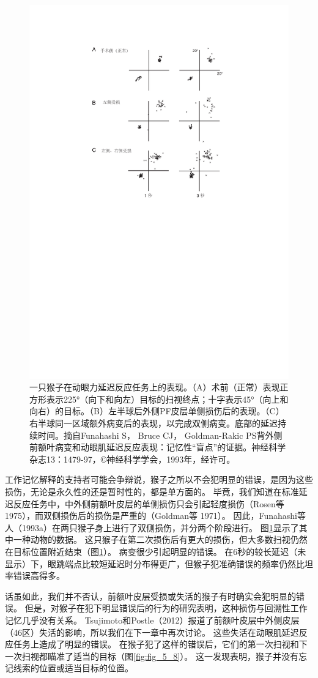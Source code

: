 \begin{figure}
	\centering
	\includegraphics[width=0.7\linewidth]{image_pfc/Fig_5_7}
	\caption{一只猴子在动眼力延迟反应任务上的表现。（A）术前（正常）表现正方形表示225°（向下和向左）目标的扫视终点；十字表示45°（向上和向右）的目标。（B）左半球后外侧PF皮层单侧损伤后的表现。（C）右半球同一区域额外病变后的表现，以完成双侧病变。底部的延迟持续时间。摘自Funahashi S， Bruce CJ， Goldman-Rakic PS背外侧前额叶病变和动眼肌延迟反应表现：记忆性“盲点”的证据。神经科学杂志13：1479-97，©神经科学学会，1993年，经许可。}
	\label{fig:fig_5_7}
\end{figure}


工作记忆解释的支持者可能会争辩说，猴子之所以不会犯明显的错误，是因为这些损伤，无论是永久性的还是暂时性的，都是单方面的。
毕竟，我们知道在标准延迟反应任务中，中外侧前额叶皮层的单侧损伤只会引起轻度损伤（Rosen等 1975），而双侧损伤后的损伤是严重的（Goldman等 1971）。
因此，Funahashi等人（1993a）在两只猴子身上进行了双侧损伤，并分两个阶段进行。
图\ref{fig:fig_5_7}显示了其中一种动物的数据。
这只猴子在第二次损伤后有更大的损伤，但大多数扫视仍然在目标位置附近结束（图\ref{fig:fig_5_7}）。
病变很少引起明显的错误。
在6秒的较长延迟（未显示）下，眼跳端点比较短延迟时分布得更广，但猴子犯准确错误的频率仍然比坦率错误高得多。


话虽如此，我们并不否认，前额叶皮层受损或失活的猴子有时确实会犯明显的错误。
但是，对猴子在犯下明显错误后的行为的研究表明，这种损伤与回溯性工作记忆几乎没有关系。
Tsujimoto和Postle（2012）报道了前额叶皮层中外侧皮层（46区）失活的影响，所以我们在下一章中再次讨论。
这些失活在动眼肌延迟反应任务上造成了明显的错误。
在猴子犯了这样的错误后，它们的第一次扫视和下一次扫视都瞄准了适当的目标（图\ref{fig:fig_5_8}）。
这一发现表明，猴子并没有忘记线索的位置或适当目标的位置。


